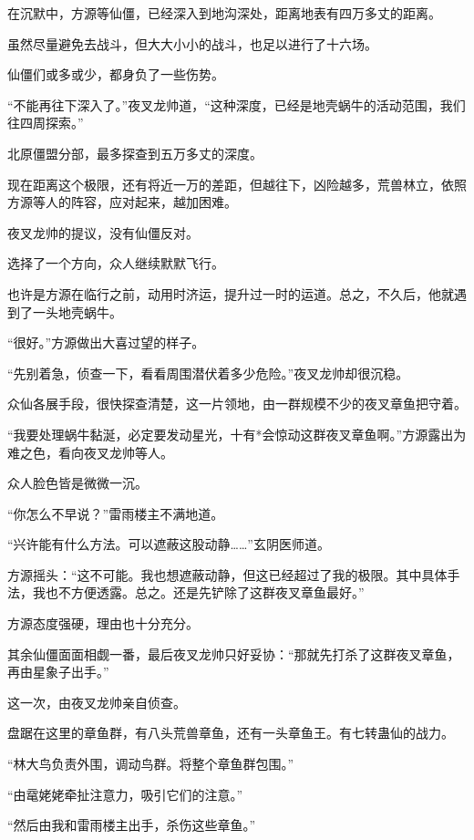 
\begin{this_body}

在沉默中，方源等仙僵，已经深入到地沟深处，距离地表有四万多丈的距离。

虽然尽量避免去战斗，但大大小小的战斗，也足以进行了十六场。

仙僵们或多或少，都身负了一些伤势。

“不能再往下深入了。”夜叉龙帅道，“这种深度，已经是地壳蜗牛的活动范围，我们往四周探索。”

北原僵盟分部，最多探查到五万多丈的深度。

现在距离这个极限，还有将近一万的差距，但越往下，凶险越多，荒兽林立，依照方源等人的阵容，应对起来，越加困难。

夜叉龙帅的提议，没有仙僵反对。

选择了一个方向，众人继续默默飞行。

也许是方源在临行之前，动用时济运，提升过一时的运道。总之，不久后，他就遇到了一头地壳蜗牛。

“很好。”方源做出大喜过望的样子。

“先别着急，侦查一下，看看周围潜伏着多少危险。”夜叉龙帅却很沉稳。

众仙各展手段，很快探查清楚，这一片领地，由一群规模不少的夜叉章鱼把守着。

“我要处理蜗牛黏涎，必定要发动星光，十有*会惊动这群夜叉章鱼啊。”方源露出为难之色，看向夜叉龙帅等人。

众人脸色皆是微微一沉。

“你怎么不早说？”雷雨楼主不满地道。

“兴许能有什么方法。可以遮蔽这股动静……”玄阴医师道。

方源摇头：“这不可能。我也想遮蔽动静，但这已经超过了我的极限。其中具体手法，我也不方便透露。总之。还是先铲除了这群夜叉章鱼最好。”

方源态度强硬，理由也十分充分。

其余仙僵面面相觑一番，最后夜叉龙帅只好妥协：“那就先打杀了这群夜叉章鱼，再由星象子出手。”

这一次，由夜叉龙帅亲自侦查。

盘踞在这里的章鱼群，有八头荒兽章鱼，还有一头章鱼王。有七转蛊仙的战力。

“林大鸟负责外围，调动鸟群。将整个章鱼群包围。”

“由鼋姥姥牵扯注意力，吸引它们的注意。”

“然后由我和雷雨楼主出手，杀伤这些章鱼。”


\end{this_body}
